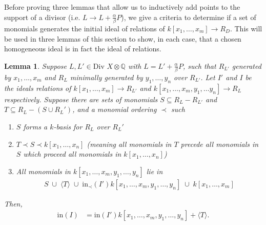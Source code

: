 \documentclass{amsart}
\theoremstyle{plain}
\newtheorem{lem}[thm]{Lemma}
\theoremstyle{definition}
\theoremstyle{remark}
\numberwithin{equation}{section}
\newcommand\BQ{{\mathbb Q}}
\newcommand \di{\text{Div }}
\newcommand \halfcan{L}
\newcommand \initial{\text{in}}
\begin{document}
Before proving three lemmas that allow us to inductively add points to the support of a divisor (i.e. $\halfcan\to \halfcan + \frac{\alpha}{\beta}P$), we give a criteria to determine if a set of monomials generates the initial ideal of relations of $k[x_1, \ldots, x_m]\to R_D$.  This will be used in three lemmas of this section to show, in each case, that a chosen homogeneous ideal is in fact the ideal of relations.


\begin{lem}\label{lem:relations_from_generators_induction} 
Suppose $\halfcan, \halfcan' \in \di X \otimes \BQ$ with $\halfcan=\halfcan'+\frac{\alpha}{\beta}P$, such that $R_{\halfcan'}$ generated by $x_1, \ldots, x_m$
and $R_{\halfcan}$ minimally generated by $y_1, \ldots, y_n$ over 
$R_{\halfcan'}$.  Let $I'$ and $I$ be the ideals relations of $k[x_1, \ldots, x_m]\to R_{\halfcan'}$ and $k[x_1, \ldots, x_m, y_1, \ldots y_n]\to R_{\halfcan}$ respectively.
Suppose there are sets of monomials $S\subseteq R_\halfcan-R_{\halfcan'}$ and $T\subseteq R_\halfcan-(S\cup R_\halfcan')$, and a monomial ordering $\prec$ such 
\begin{enumerate}
\item $S$ forms a $k$-basis for $R_\halfcan$ over $R_\halfcan'$
\item $T\prec S\prec k[x_1, \ldots, x_n]$ (meaning all monomials in $T$ precede all monomials in $S$ which proceed all monomials in $k[x_1, \ldots, x_n]$)
\item All monomials in $k[x_1, \ldots, x_m, y_1, \ldots, y_n]$ lie in 
\begin{align*}
	S \; \cup\; \langle T\rangle \; \cup \; \initial_\prec(I') k[x_1, \ldots, x_m, y_1, \ldots, y_n] \; \cup \; k[x_1, \ldots, x_m]
\end{align*}
\end{enumerate}
Then,
\begin{align*}
	\initial(I) & = \initial(I') k[x_1, \ldots, x_m, y_1, \ldots, y_n]
	+ \langle T \rangle.
\end{align*}
\end{lem}
\end{document}
